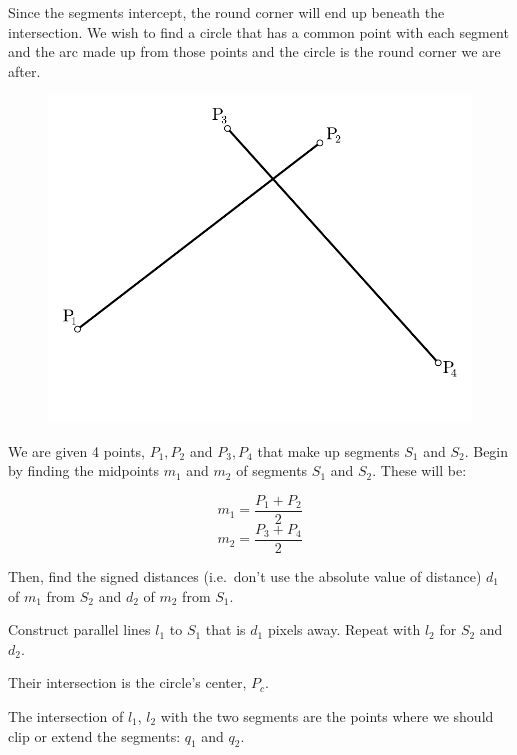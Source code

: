 \documentclass[12pt,openany,a4,usenames,dvipsnames]{book}
\begin{document}
Since the segments intercept, the round corner will end up beneath the intersection. We wish to find a circle
that has a common point with each segment and the arc made up from those points and the circle is the round corner we are after.

\begin{figure}[H]%
  \centering{}%
\includegraphics[width=\textwidth,keepaspectratio]{figures/fillet_1.pdf}%
\end{figure}%
%
\noindent{}We are given 4 points, $P_{1}, P_{2}$ and $P_{3}, P_{4}$ that make up segments $S_1$ and $S_2$.
Begin by finding the midpoints $m_1$ and $m_2$ of segments $S_1$ and $S_2$. These will be:

$$m_1 = \frac{P_1 + P_2}{2}$$
$$m_2 = \frac{P_3 + P_4}{2}$$

\noindent{}Then, find the signed distances (i.e.\ don't use the absolute value of distance) $d_1$ of $m_1$ from $S_2$ and $d_2$ of $m_2$ from $S_1$.

\noindent{}Construct parallel lines $l_1$ to $S_1$ that is $d_1$ pixels away. Repeat with $l_2$ for $S_2$ and $d_2$.

\noindent{}Their intersection is the circle's center, $P_c$.%

\noindent{}The intersection of $l_1$, $l_2$ with the two segments are the points where we should clip or extend the segments: $q_1$ and $q_2$.
\end{document}
